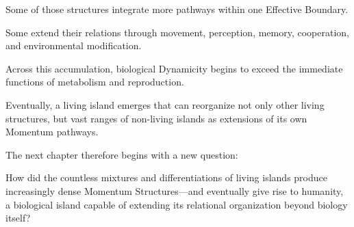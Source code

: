 Some of those structures integrate more pathways within one Effective Boundary.

Some extend their relations through movement, perception, memory, cooperation, and environmental modification.

Across this accumulation, biological Dynamicity begins to exceed the immediate functions of metabolism and reproduction.

Eventually, a living island emerges that can reorganize not only other living structures, but vast ranges of non-living islands as extensions of its own Momentum pathways.

The next chapter therefore begins with a new question:

How did the countless mixtures and differentiations of living islands produce increasingly dense Momentum Structures—and eventually give rise to humanity, a biological island capable of extending its relational organization beyond biology itself?
